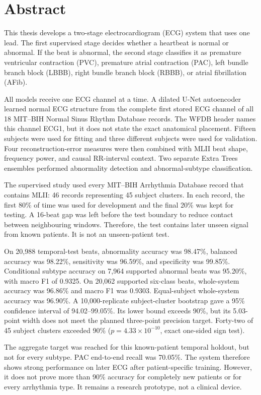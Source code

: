 \chapter*{Abstract}\label{abstract}
{}%
\prevspace
This thesis develops a two-stage electrocardiogram (ECG) system that uses one
lead. The first supervised stage decides whether a heartbeat is normal or
abnormal. If the beat is abnormal, the second stage classifies it as premature
ventricular contraction (PVC), premature atrial contraction (PAC), left bundle
branch block (LBBB), right bundle branch block (RBBB), or atrial fibrillation
(AFib).

All models receive one ECG channel at a time. A dilated U-Net autoencoder
learned normal ECG structure from the complete first stored ECG channel of all
18 MIT--BIH Normal Sinus Rhythm Database records. The WFDB header names this
channel ECG1, but it does not state the exact anatomical placement. Fifteen
subjects were used for fitting and three different subjects were used for
validation. Four reconstruction-error measures were then combined with MLII
beat shape, frequency power, and causal RR-interval context. Two separate Extra
Trees ensembles performed abnormality detection and abnormal-subtype
classification.

The supervised study used every MIT--BIH Arrhythmia Database record that
contains MLII: 46 records representing 45 subject clusters. In each record, the
first 80\% of time was used for development and the final 20\% was kept for
testing. A 16-beat gap was left before the test boundary to reduce contact
between neighbouring windows. Therefore, the test contains later unseen signal
from known patients. It is not an unseen-patient test.

On 20,988 temporal-test beats, abnormality accuracy was 98.47\%, balanced accuracy was
98.22\%, sensitivity was 96.59\%, and specificity was 99.85\%. Conditional
subtype accuracy on 7,964 supported abnormal beats was 95.20\%, with macro F1
of 0.9325. On 20,062 supported six-class beats, whole-system accuracy was
96.86\% and macro F1 was 0.9303. Equal-subject whole-system accuracy was
96.90\%. A 10,000-replicate subject-cluster bootstrap gave a 95\% confidence
interval of 94.02--99.05\%. Its lower bound exceeds 90\%, but its 5.03-point
width does not meet the planned three-point precision target. Forty-two of 45
subject clusters exceeded 90\% ($p=4.33\times10^{-10}$, exact one-sided sign
test).

The aggregate target was reached for this known-patient temporal holdout, but
not for every subtype. PAC end-to-end recall was 70.05\%. The system therefore
shows strong performance on later ECG after patient-specific training. However,
it does not prove more than 90\% accuracy for completely new patients or for
every arrhythmia type. It remains a research prototype, not a clinical device.
